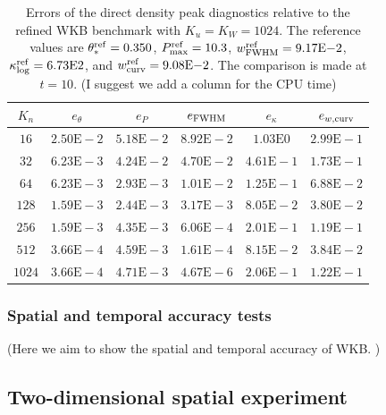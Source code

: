 \documentclass[11pt]{article}
\begin{document}
\begin{table}[htbp]
\centering
\caption{Errors of the direct density peak diagnostics relative to the refined
WKB benchmark with \(K_u=K_W=1024\).  The reference values are
\(\theta_*^{\rm ref}=0.350\), \(P_{\max}^{\rm ref}=10.3\),
\(w_{\rm FWHM}^{\rm ref}=9.17{\rm E}{-2}\),
\(\kappa_{\log}^{\rm ref}=6.73{\rm E}{2}\), and
\(w_{\rm curv}^{\rm ref}=9.08{\rm E}{-2}\).  The comparison is made at
\(t=10\).  {\color{red} (I suggest we add a column for the CPU time)}}
\label{tab:direct_peak_errors_wkb_ref}
\small
\begin{tabular}{c c c c c c}
\hline
\(K_n\) & \(e_{\theta}\) & \(e_P\) & \(e_{\rm FWHM}\) & \(e_{\kappa}\) & \(e_{w,\rm curv}\) \\
\hline
\(16\)   & \(2.50\mathrm{E}{-}2\) & \(5.18\mathrm{E}{-}2\) & \(8.92\mathrm{E}{-}2\) & \(1.03\mathrm{E}{0}\)  & \(2.99\mathrm{E}{-}1\) \\
\(32\)   & \(6.23\mathrm{E}{-}3\) & \(4.24\mathrm{E}{-}2\) & \(4.70\mathrm{E}{-}2\) & \(4.61\mathrm{E}{-}1\) & \(1.73\mathrm{E}{-}1\) \\
\(64\)   & \(6.23\mathrm{E}{-}3\) & \(2.93\mathrm{E}{-}3\) & \(1.01\mathrm{E}{-}2\) & \(1.25\mathrm{E}{-}1\) & \(6.88\mathrm{E}{-}2\) \\
\(128\)  & \(1.59\mathrm{E}{-}3\) & \(2.44\mathrm{E}{-}3\) & \(3.17\mathrm{E}{-}3\) & \(8.05\mathrm{E}{-}2\) & \(3.80\mathrm{E}{-}2\) \\
\(256\)  & \(1.59\mathrm{E}{-}3\) & \(4.35\mathrm{E}{-}3\) & \(6.06\mathrm{E}{-}4\) & \(2.01\mathrm{E}{-}1\) & \(1.19\mathrm{E}{-}1\) \\
\(512\)  & \(3.66\mathrm{E}{-}4\) & \(4.59\mathrm{E}{-}3\) & \(1.61\mathrm{E}{-}4\) & \(8.15\mathrm{E}{-}2\) & \(3.84\mathrm{E}{-}2\) \\
\(1024\) & \(3.66\mathrm{E}{-}4\) & \(4.71\mathrm{E}{-}3\) & \(4.67\mathrm{E}{-}6\) & \(2.06\mathrm{E}{-}1\) & \(1.22\mathrm{E}{-}1\) \\
\hline
\end{tabular}
\end{table}




\subsubsection{Spatial and temporal accuracy tests}\label{subsec:test_accuracy_new}

(Here we aim to show the spatial and temporal accuracy of WKB. )

\subsection{Two-dimensional spatial experiment}\label{subsec:test_2d_new}
\end{document}
